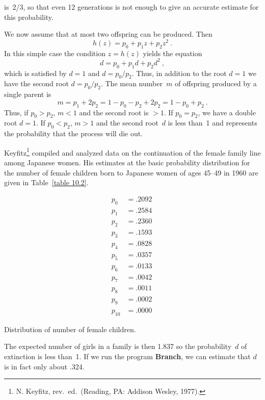 is~2/3, so that even 12 generations is not enough to give an accurate estimate
for this probability.
\par
We now assume that at most two offspring can be produced.  Then
$$
h(z) = p_0 + p_1z + p_2z^2\ .
$$
In this simple case the condition $z = h(z)$ yields the equation
$$
d = p_0 + p_1d + p_2d^2\ ,
$$
which is satisfied by $d = 1$ and $d = p_0/p_2$.  Thus, in addition to the root
$d = 1$ we have the second root $d = p_0/p_2$.  The mean number~$m$ of offspring
produced by a single parent is
$$
m = p_1 + 2p_2 = 1 - p_0 - p_2 + 2p_2 = 1 - p_0 + p_2\ .
$$
Thus, if $p_0 > p_2$, $m < 1$ and the second root is ${} > 1$.  If $p_0 = p_2$,
we have a double root $d = 1$.  If $p_0 < p_2$, $m > 1$ and the second root~$d$
is less than~1 and represents the probability that the process will die out.

\begin{example}\label{exam 10.2.3}
Keyfitz\footnote{N. Keyfitz,  rev.~ed.\ (Reading, PA: Addison Wesley, 1977).} compiled and
analyzed data on the continuation of the female family line among Japanese
women.  His estimates at the basic probability distribution for the number of
female children born to Japanese women of ages 45--49 in 1960 are given in Table~\ref{table 10.2}.
\begin{table}
\centering
$$\begin{array}{rl}
p_0 &= .2092 \\
p_1 &= .2584 \\
p_2 &= .2360 \\
p_3 &= .1593 \\
p_4 &= .0828 \\
p_5 &= .0357 \\
p_6 &= .0133 \\
p_7 &= .0042 \\
p_8 &= .0011 \\
p_9 &= .0002 \\
p_{10} &= .0000\  
\end{array}
$$
\caption{Distribution of number of female children.}
\label{table 10.2}
\end{table}

The expected number of girls in a family is then 1.837 so the probability~$d$
of extinction is less than~1.  If we run the program {\bf Branch}, we can estimate
that $d$ is in fact only about .324.
\end{example}

